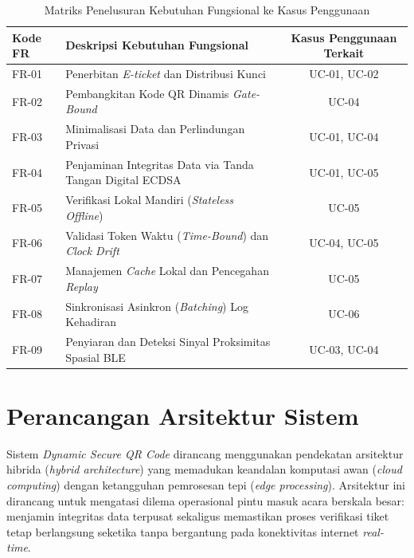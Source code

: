 \begin{table}[htbp]
    \caption{Matriks Penelusuran Kebutuhan Fungsional ke Kasus Penggunaan}
    \label{tab:traceability_matrix}
    \centering
    \begin{tabularx}{\textwidth}{ l >{\raggedright\arraybackslash}X c }
        \toprule
        \textbf{Kode FR} & \textbf{Deskripsi Kebutuhan Fungsional} & \textbf{Kasus Penggunaan Terkait} \\
        \midrule
        FR-01 & Penerbitan \textit{E-ticket} dan Distribusi Kunci & UC-01, UC-02 \\
        FR-02 & Pembangkitan Kode QR Dinamis \textit{Gate-Bound} & UC-04 \\
        FR-03 & Minimalisasi Data dan Perlindungan Privasi & UC-01, UC-04 \\
        FR-04 & Penjaminan Integritas Data via Tanda Tangan Digital ECDSA & UC-01, UC-05 \\
        FR-05 & Verifikasi Lokal Mandiri (\textit{Stateless Offline}) & UC-05 \\
        FR-06 & Validasi Token Waktu (\textit{Time-Bound}) dan \textit{Clock Drift} & UC-04, UC-05 \\
        FR-07 & Manajemen \textit{Cache} Lokal dan Pencegahan \textit{Replay} & UC-05 \\
        FR-08 & Sinkronisasi Asinkron (\textit{Batching}) Log Kehadiran & UC-06 \\
        FR-09 & Penyiaran dan Deteksi Sinyal Proksimitas Spasial BLE & UC-03, UC-04 \\
        \bottomrule
    \end{tabularx}
\end{table}

\section{Perancangan Arsitektur Sistem}
\label{sec:perancangan_arsitektur}

Sistem \textit{Dynamic Secure QR Code} dirancang menggunakan pendekatan arsitektur hibrida (\textit{hybrid architecture}) yang memadukan keandalan komputasi awan (\textit{cloud computing}) dengan ketangguhan pemrosesan tepi (\textit{edge processing}). Arsitektur ini dirancang untuk mengatasi dilema operasional pintu masuk acara berskala besar: menjamin integritas data terpusat sekaligus memastikan proses verifikasi tiket tetap berlangsung seketika tanpa bergantung pada konektivitas internet \textit{real-time}.

